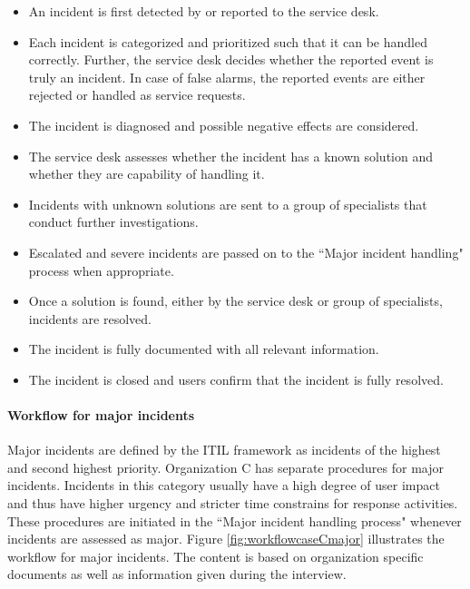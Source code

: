 \begin{itemize}\itemsep-0.1cm
\item An incident is first detected by or reported to the service desk.
\item Each incident is categorized and prioritized such that it can be handled correctly. Further, the service desk decides whether the reported event is truly an incident. In case of false alarms, the reported events are either rejected or handled as service requests.
\item The incident is diagnosed and possible negative effects are considered.
\item The service desk assesses whether the incident has a known solution and whether they are capability of handling it.
\item Incidents with unknown solutions are sent to a group of specialists that conduct further investigations.
\item Escalated and severe incidents are passed on to the ``Major incident handling" process when appropriate. 
\item Once a solution is found, either by the service desk or group of specialists, incidents are resolved.
\item The incident is fully documented with all relevant information.
\item The incident is closed and users confirm that the incident is fully resolved. 
\end{itemize}

\paragraph{Workflow for major incidents}
Major incidents are defined by the ITIL framework as incidents of the highest and second highest priority. Organization C has separate procedures for major incidents. Incidents in this category usually have a high degree of user impact and thus have higher urgency and stricter time constrains for response activities. These procedures are initiated in the ``Major incident handling process" whenever incidents are assessed as major. Figure \ref{fig:workflowcaseCmajor} illustrates the workflow for major incidents. The content is based on organization specific documents as well as information given during the interview.

